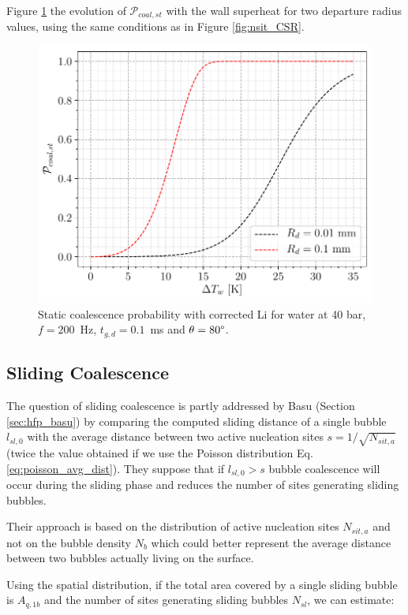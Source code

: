 Figure \ref{fig:pcoal_st} the evolution of $\mathcal{P}_{coal,st}$ with the wall superheat for two departure radius values, using the same conditions as in Figure \ref{fig:nsit_CSR}.

\begin{figure}[!h]
\centering
\includegraphics[width=0.6\linewidth]{img/site_interaction/P_coal_st.pdf}
\caption{Static coalescence probability with corrected Li \etal for water at 40 bar, $f=200$~Hz, $t_{g,d} = 0.1$~ms and $\theta=80\degree$.}
\label{fig:pcoal_st}
\end{figure}



\subsection{Sliding Coalescence}


The question of sliding coalescence is partly addressed by Basu \etal \cite{basu_wall_2005} (Section \ref{sec:hfp_basu}) by comparing the computed sliding distance of a single bubble $l_{sl,0}$ with the average distance between two active nucleation sites $s = 1 / \sqrt{N_{sit,a}}$ (twice the value obtained if we use the Poisson distribution Eq. \ref{eq:poisson_avg_dist}). They suppose that if $l_{sl,0} > s$ bubble coalescence will occur during the sliding phase and reduces the number of sites generating sliding bubbles.

\begin{remark*}{}
Their approach is based on the distribution of active nucleation sites $N_{sit,a}$ and not on the bubble density $N_{b}$ which could better represent the average distance between two bubbles actually living on the surface.
\end{remark*}


Using the spatial distribution, if the total area covered by a single sliding bubble is $A_{q,1b}$ and the number of sites generating sliding bubbles $N_{sl}$, we can estimate:

